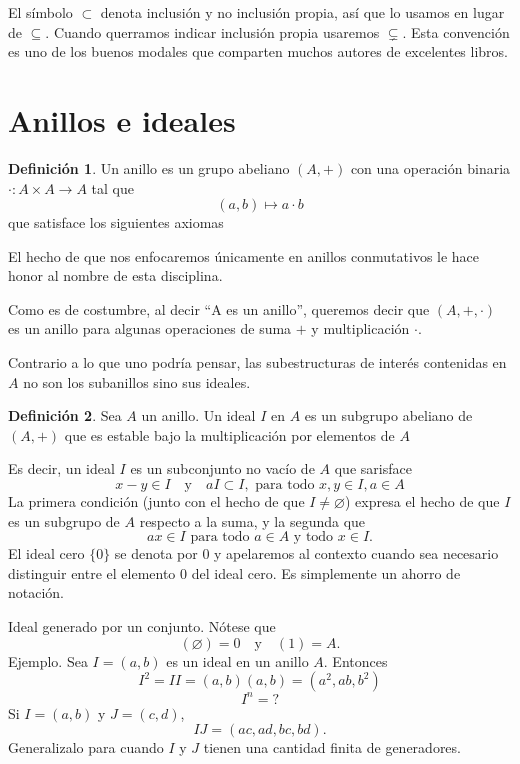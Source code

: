 \documentclass[b5paper,10pt]{book}
\theoremstyle{definition}
\newtheorem{defi}{Definición}
\begin{document}
El símbolo \(\subset\) denota inclusión y no inclusión propia,
así que lo usamos en lugar de \(\subseteq\).
Cuando querramos indicar inclusión propia usaremos \(\subsetneq\).	
Esta convención es uno de los buenos modales
que comparten muchos autores de excelentes libros.

\section{Anillos e ideales}



\begin{defi}
Un anillo es un grupo abeliano \((A,+)\) con una operación binaria
\(\cdot : A\times A\to A\) tal que
\[
	(a,b)\mapsto a\cdot b
\]
que satisface los siguientes axiomas
\end{defi}

El hecho de que nos enfocaremos únicamente
en anillos conmutativos le hace honor al nombre de 
esta disciplina.

Como es de costumbre, al decir 
``A es un anillo'', 
queremos decir que 
\((A,+,\cdot)\) es un anillo
para algunas operaciones de suma \(+\) y multiplicación \(\cdot\).

Contrario a lo que uno podría pensar,
las subestructuras de interés contenidas en \(A\)
no son los subanillos sino sus ideales.

\begin{defi}
Sea \(A\) un anillo.
Un ideal \(I\) en \(A\) es un subgrupo abeliano de \((A,+)\)
que es estable bajo la multiplicación por elementos de \(A\)
\end{defi}
Es decir, un ideal \(I\) es un subconjunto no vacío de \(A\) 
que sarisface
\[
x-y\in I\quad\text{y}\quad a I\subset I, \text{ para todo } x,y\in I, a \in A
\]
La primera condición (junto con el hecho de que \(I\neq \varnothing\))
expresa el hecho de que \(I\) es un subgrupo de \(A\) respecto a la suma,
y la segunda que 
\[
ax \in I \text{ para todo } a\in A \text{ y todo } x\in I.
\]
El ideal cero \(\{0\}\) se denota por \(0\)
y apelaremos al contexto cuando sea necesario
distinguir entre el elemento \(0\) del ideal cero.
Es simplemente un ahorro de notación.

Ideal generado por un conjunto.
Nótese que 
\[
(\varnothing) = 0\quad \text{y}\quad (1) = A.
\]
Ejemplo.
Sea \(I = (a,b)\) es un ideal en un anillo \(A\).
Entonces \[I^2 = II = (a,b)(a,b)= (a^2, ab, b^2)\]
\[
I^n = ? 
\]
Si \(I = (a,b)\) y \(J=(c,d)\),
\[
IJ = (ac,ad,bc,bd).
\]
Generalizalo para cuando \(I\) y \(J\) 
tienen una cantidad finita de generadores.
\end{document}
